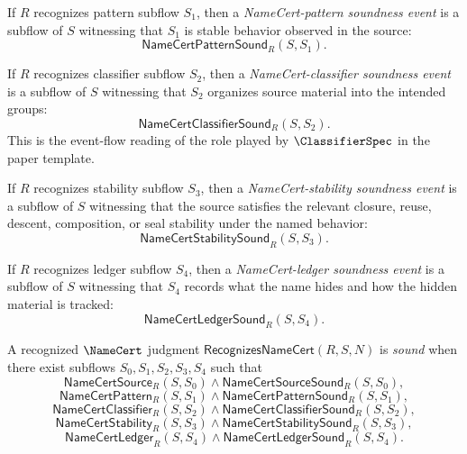 \begin{definition}
\label{def:namecert-generated-pattern-soundness}
If $R$ recognizes pattern subflow $S_{1}$, then a \emph{NameCert-pattern soundness event} is a subflow of $S$ witnessing that $S_{1}$ is stable behavior observed in the source:
$$
  \mathsf{NameCertPatternSound}_{R}(S,S_{1}).
$$
\end{definition}

\begin{definition}
\label{def:namecert-generated-classifier-soundness}
If $R$ recognizes classifier subflow $S_{2}$, then a \emph{NameCert-classifier soundness event} is a subflow of $S$ witnessing that $S_{2}$ organizes source material into the intended groups:
$$
  \mathsf{NameCertClassifierSound}_{R}(S,S_{2}).
$$
This is the event-flow reading of the role played by $\ClassifierSpec$ in the paper template.
\end{definition}

\begin{definition}
\label{def:namecert-generated-stability-soundness}
If $R$ recognizes stability subflow $S_{3}$, then a \emph{NameCert-stability soundness event} is a subflow of $S$ witnessing that the source satisfies the relevant closure, reuse, descent, composition, or seal stability under the named behavior:
$$
  \mathsf{NameCertStabilitySound}_{R}(S,S_{3}).
$$
\end{definition}

\begin{definition}
\label{def:namecert-generated-ledger-soundness}
If $R$ recognizes ledger subflow $S_{4}$, then a \emph{NameCert-ledger soundness event} is a subflow of $S$ witnessing that $S_{4}$ records what the name hides and how the hidden material is tracked:
$$
  \mathsf{NameCertLedgerSound}_{R}(S,S_{4}).
$$
\end{definition}

\begin{definition}
\label{def:namecert-generated-sound-recognized-flow}
A recognized $\NameCert$ judgment $\mathsf{RecognizesNameCert}(R,S,N)$ is \emph{sound} when there exist subflows $S_{0},S_{1},S_{2},S_{3},S_{4}$ such that
$$
  \mathsf{NameCertSource}_{R}(S,S_{0})
  \wedge
  \mathsf{NameCertSourceSound}_{R}(S,S_{0}),
$$
$$
  \mathsf{NameCertPattern}_{R}(S,S_{1})
  \wedge
  \mathsf{NameCertPatternSound}_{R}(S,S_{1}),
$$
$$
  \mathsf{NameCertClassifier}_{R}(S,S_{2})
  \wedge
  \mathsf{NameCertClassifierSound}_{R}(S,S_{2}),
$$
$$
  \mathsf{NameCertStability}_{R}(S,S_{3})
  \wedge
  \mathsf{NameCertStabilitySound}_{R}(S,S_{3}),
$$
$$
  \mathsf{NameCertLedger}_{R}(S,S_{4})
  \wedge
  \mathsf{NameCertLedgerSound}_{R}(S,S_{4}).
$$
\end{definition}

